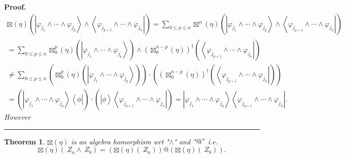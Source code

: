 \documentclass[aps,preprint]{revtex4}%
\newtheorem{theorem}{Theorem}
\newenvironment{proof}[1][Proof]{\noindent\textbf{#1.} }{\ \rule{0.5em}{0.5em}}
\begin{document}
\begin{proof}%
\begin{gather}
\boxtimes\left(  \eta\right)  \left(  \overset{}{\left\vert \varphi_{j_{1}%
}\wedge\cdots\wedge\varphi_{j_{p}}\right\rangle \wedge\left\langle
\varphi_{j_{p+1}}\wedge\cdots\wedge\varphi_{j_{n}}\right\vert }\right)
=\sum_{0\leq p\leq n}\boxtimes^{n}\left(  \eta\right)  \left(
\overset{}{\left\vert \varphi_{j_{1}}\wedge\cdots\wedge\varphi_{j_{p}%
}\right\rangle \wedge\left\langle \varphi_{j_{p+1}}\wedge\cdots\wedge
\varphi_{j_{n}}\right\vert }\right) \\
=\sum_{0\leq p\leq n}\boxtimes_{0}^{p}\left(  \eta\right)  \overset{}{\left(
\left\vert \varphi_{j_{1}}\wedge\cdots\wedge\varphi_{j_{p}}\right\rangle
\right)  \wedge\left(  \boxtimes_{0}^{n-p}\left(  \eta\right)  \right)
^{\dagger}\left(  \left\langle \varphi_{j_{p+1}}\wedge\cdots\wedge
\varphi_{j_{n}}\right\vert \right)  }\\
\neq\sum_{0\leq p\leq n}\left(  \boxtimes_{0}^{p}\left(  \eta\right)  \left(
\overset{}{\left\vert \varphi_{j_{1}}\wedge\cdots\wedge\varphi_{j_{p}%
}\right\rangle }\right)  \right)  \cdot\left(  \left(  \boxtimes_{0}%
^{n-p}\left(  \eta\right)  \right)  ^{\dagger}\left(  \overset{}{\left\langle
\varphi_{j_{p+1}}\wedge\cdots\wedge\varphi_{j_{n}}\right\vert }\right)
\right) \\
=\left(  \left\vert \overset{}{\varphi_{j_{1}}\wedge\cdots\wedge\varphi
_{j_{p}}}\right\rangle \left\langle \overset{}{\phi}\right\vert \right)
\cdot\left(  \left\vert \overset{}{\phi}\right\rangle \left\langle
\overset{}{\varphi_{j_{p+1}}\wedge\cdots\wedge\varphi_{j_{n}}}\right\vert
\right)  =\left\vert \overset{}{\varphi_{j_{1}}\wedge\cdots\wedge
\varphi_{j_{p}}}\right\rangle \left\langle \overset{}{\varphi_{j_{p+1}}%
\wedge\cdots\wedge\varphi_{j_{n}}}\right\vert .
\end{gather}
\emph{However}
\end{proof}

\begin{theorem}
$\boxtimes\left(  \eta\right)  $ \emph{is an algebra homorphism wrt "}$\wedge
$\emph{" and "}$@"$\emph{ i.e.}
\begin{equation}
\boxtimes\left(  \eta\right)  \left(  \ Z_{a}\wedge\ Z_{b}\right)  =\left(
\boxtimes\left(  \eta\right)  \left(  \ Z_{a}\right)  \right)  @\left(
\boxtimes\left(  \eta\right)  \left(  \ Z_{b}\right)  \right)  .
\end{equation}

\end{theorem}
\end{document}
